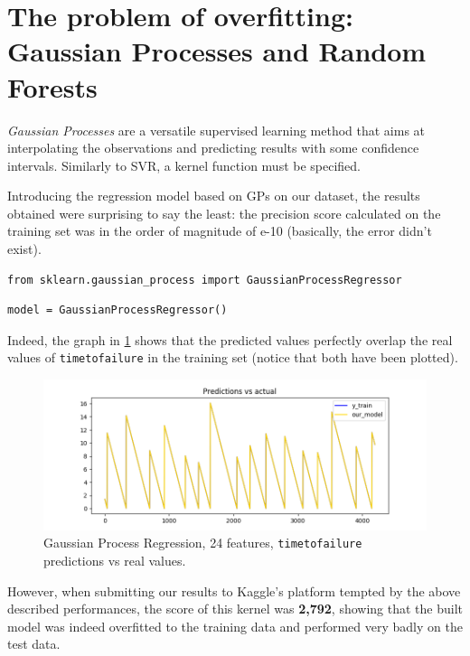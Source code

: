 \section[Overfitting]{The problem of overfitting: Gaussian Processes and Random Forests}
\textit{Gaussian Processes} are a versatile supervised learning method that aims at interpolating the observations and predicting results with some confidence intervals. Similarly to SVR, a kernel function must be specified.

Introducing the regression model based on GPs on our dataset, the results obtained were surprising to say the least: the precision score calculated on the training set was in the order of magnitude of e-10 (basically, the error didn't exist).

\begin{lstlisting}[firstnumber=14]
from sklearn.gaussian_process import GaussianProcessRegressor
\end{lstlisting}

\begin{lstlisting}[firstnumber=101]
model = GaussianProcessRegressor()
\end{lstlisting}

Indeed, the graph in \ref{fig:GP} shows that the predicted values perfectly overlap the real values of \texttt{time\textunderscore to\textunderscore failure} in the training set (notice that both have been plotted).

\begin{figure} [h]
	\centering
	\includegraphics[width=1\linewidth]{pictures/gpr_24f.png}
	\caption{Gaussian Process Regression, 24 features, \texttt{time\textunderscore to\textunderscore failure} predictions vs real values.}
	\label{fig:GP}
\end{figure}

However, when submitting our results to Kaggle's platform tempted by the above described performances, the score of this kernel was \textbf{2,792}, showing that the built model was indeed overfitted to the training data and performed very badly on the test data.


